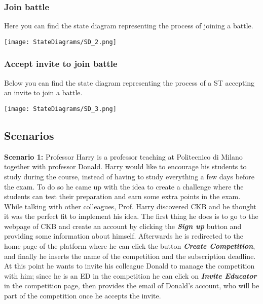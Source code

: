 \subsubsection*{Join battle}
Here you can find the state diagram representing the process of joining a battle.
  \begin{center}
    \texttt{[image: StateDiagrams/SD\_2.png]}
  \end{center}

\subsubsection*{Accept invite to join battle}
Below you can find the state diagram representing the process of a ST accepting an invite to join a battle.
  \begin{center}
    \texttt{[image: StateDiagrams/SD\_3.png]}
  \end{center}

  
\subsection{Scenarios}
\label{ss:scenarios}%
\textbf{Scenario 1:} Professor Harry is a professor teaching at Politecnico di Milano together with professor Donald. Harry would like to encourage his students to study during the course, instead of having to study everything a few days before the exam. To do so he came up with the idea to create a challenge where the students can test their preparation and earn some extra points in the exam. While talking with other colleagues, Prof. Harry discovered CKB and he thought it was the perfect fit to implement his idea. The first thing he does is to go to the webpage of CKB and create an account by clicking the \textbf{\textit{Sign up}} button and providing some information about himself. Afterwards he is redirected to the home page of the platform where he can click the button \textbf{\textit{Create Competition}}, and finally he inserts the name of the competition and the subscription deadline. At this point he wants to invite his colleague Donald to manage the competition with him; since he is an ED in the competition he can click on \textbf{\textit{Invite Educator}} in the competition page, then provides the email of Donald's account, who will be part of the competition once he accepts the invite.


